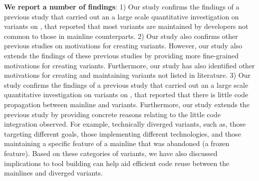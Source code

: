 \nd \textbf{We report a number of findings}: 1) Our study confirms the findings of a previous study that carried out an a large scale quantitative investigation on variants on \gh, that reported that most variants are maintained by developers not common to those in mainline counterparts. 2) Our study also confirms other previous studies on motivations for creating variants. However, our study also extends the findings of these previous studies by providing more fine-grained motivations for creating variants. Furthermore, our study has also identified other motivations for creating and maintaining variants not listed in literature. 3) Our study confirms the findings of a previous study that carried out an a large scale quantitative investigation on variants on \gh, that reported that there is little code propagation between mainline and variants. Furthermore, our study extends the previous study by providing concrete reasons relating to the little code integration observed. For example, technically diverged variants, such as, those targeting different goals, those implementing different technologies, and those maintaining a specific feature of a mainline that was abandoned (a frozen feature). Based on these categories of variants, we have also discussed implications to tool building can help aid efficient code reuse between the mainlines and diverged variants.


